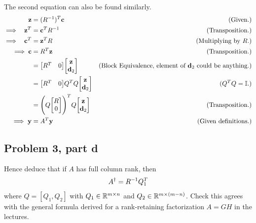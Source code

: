 \begin{solution}
    The second equation can also be found similarly. 
    \alignbreak
    \begin{align*}
        \textbf{z} &= (R^\inv)^T\textbf{c} &\text{(Given.)}\\
        \implies \ \ \textbf{z}^T &= \textbf{c}^TR^\inv &\text{(Transposition.)}\\
        \implies \ \ \textbf{c}^T &= \textbf{z}^TR &\text{(Multiplying by $R$.)}\\
        \implies  \textbf{c} &= R^T\textbf{z} &\text{(Transposition.)}\\
        &= \mqty[R^T&0] \mqty[\textbf{z}\\\textbf{d}_2] &\text{(Block Equivalence, element of $\textbf{d}_2$ could be anything.)}\\
        &= \mqty[R^T&0] Q^TQ\mqty[\textbf{z}\\\textbf{d}_2] &(Q^TQ = \id.)\\
        &= \Bigg( Q\mqty[R\\0]\Bigg)^TQ\mqty[\textbf{z}\\\textbf{d}_2] &\text{(Transposition.)}\\
        \implies \textbf{y} &= A^T\textbf{y} &\text{(Given definitions.)}
    \end{align*}
    \alignbreak
\end{solution}

\newpage
\subsection{Problem 3, part d}
Hence deduce that if $A$ has full column rank, then 
\[
A^\dag = R^{-1} Q^T_1
\]
where $Q = [Q_1, Q_2]$ with $Q_1 \in \mathbb{R}^{m\times n}$ and $Q_2 \in \mathbb{R}^{m\times (m - n)}$. Check this agrees with the general formula derived for a rank-retaining factorization $A = GH$ in the lectures. 

